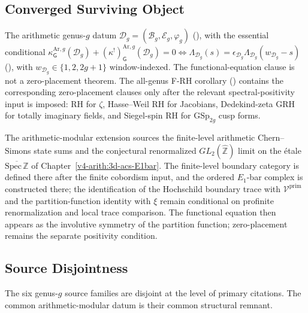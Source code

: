 \subsection{Converged Surviving Object}
\label{v4-arith:app:B:genus-g:converged}

The arithmetic genus-\(g\) datum \(\mathcal{D}_g=(\mathcal{B}_g,\mathcal{E}_g,\varphi_g)\)
(), with the essential conditional
\(\kappa^{\mathrm{Ar},g}_{\mathsf{G}}(\mathcal{D}_g)+(\kappa^{!})^{\mathrm{Ar},g}_{\mathsf{G}}(\mathcal{D}_g)=0\Leftrightarrow\Lambda_{\mathcal{D}_g}(s)=\epsilon_{\mathcal{D}_g}\Lambda_{\mathcal{D}_g}(w_{\mathcal{D}_g}-s)\)
(), with
\(w_{\mathcal{D}_g}\in\{1,2,2g+1\}\) window-indexed. The
functional-equation clause is not a zero-placement theorem. The
all-genus F-RH corollary
() contains the corresponding
zero-placement clauses only after the relevant spectral-positivity
input is imposed: RH for \(\zeta\), Hasse--Weil RH for Jacobians,
Dedekind-zeta GRH for totally imaginary fields, and Siegel-spin RH for
\(\mathrm{GSp}_{2g}\) cusp forms.

The arithmetic-modular extension sources the finite-level
arithmetic Chern--Simons state sums and the conjectural renormalized
$GL_{2}(\widehat{\mathbb{Z}})$ limit on the \'etale
$\overline{\mathrm{Spec}\,\mathbb{Z}}$ of
Chapter~\ref{v4-arith:3d-acs-E1bar}. The finite-level boundary
category is defined there after the finite cobordism input, and the
ordered $E_{1}$-bar complex is constructed there; the identification
of the Hochschild boundary trace with $\mathcal{V}^{\mathrm{prim}}$
and the partition-function identity with $\xi$ remain conditional on
profinite renormalization and local trace comparison. The functional
equation then appears as the involutive symmetry of the partition
function; zero-placement remains the separate positivity condition.

\subsection{Source Disjointness}
\label{v4-arith:app:B:genus-g:criterion}

The six genus-\(g\) source families are disjoint at the level of primary
citations. The common arithmetic-modular datum is their common
structural remnant.
